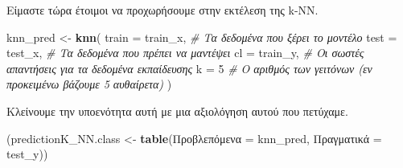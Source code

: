 \documentclass[
]{article}
\newenvironment{Shaded}{\begin{snugshade}}{\end{snugshade}}
\newcommand{\AttributeTok}[1]{\textcolor[rgb]{0.13,0.29,0.53}{#1}}
\newcommand{\CommentTok}[1]{\textcolor[rgb]{0.56,0.35,0.01}{\textit{#1}}}
\newcommand{\ConstantTok}[1]{\textcolor[rgb]{0.56,0.35,0.01}{#1}}
\newcommand{\DecValTok}[1]{\textcolor[rgb]{0.00,0.00,0.81}{#1}}
\newcommand{\FloatTok}[1]{\textcolor[rgb]{0.00,0.00,0.81}{#1}}
\newcommand{\FunctionTok}[1]{\textcolor[rgb]{0.13,0.29,0.53}{\textbf{#1}}}
\newcommand{\NormalTok}[1]{#1}
\newcommand{\OtherTok}[1]{\textcolor[rgb]{0.56,0.35,0.01}{#1}}
\newcommand{\SpecialCharTok}[1]{\textcolor[rgb]{0.81,0.36,0.00}{\textbf{#1}}}
\begin{document}
\begin{Shaded}
\end{Shaded}

Είμαστε τώρα έτοιμοι να προχωρήσουμε στην εκτέλεση της k-NN.

\begin{Shaded}
\begin{Highlighting}[]
\NormalTok{knn\_pred }\OtherTok{\textless{}{-}} \FunctionTok{knn}\NormalTok{(}
  \AttributeTok{train =}\NormalTok{ train\_x, }\CommentTok{\# Τα δεδομένα που ξέρει το μοντέλο}
  \AttributeTok{test =}\NormalTok{ test\_x, }\CommentTok{\# Τα δεδομένα που πρέπει να μαντέψει}
  \AttributeTok{cl =}\NormalTok{ train\_y, }\CommentTok{\# Οι σωστές απαντήσεις για τα δεδομένα εκπαίδευσης}
  \AttributeTok{k =} \DecValTok{5} \CommentTok{\# Ο αριθμός των γειτόνων (εν προκειμένω βάζουμε 5 αυθαίρετα)}
\NormalTok{  )}
\end{Highlighting}
\end{Shaded}

Κλείνουμε την υποενότητα αυτή με μια αξιολόγηση αυτού που πετύχαμε.

\begin{Shaded}
\begin{Highlighting}[]
\NormalTok{(predictionK\_NN.class }\OtherTok{\textless{}{-}} \FunctionTok{table}\NormalTok{(Προβλεπόμενα }\OtherTok{=}\NormalTok{ knn\_pred, Πραγματικά }\OtherTok{=}\NormalTok{ test\_y))}
\end{Highlighting}
\end{Shaded}
\end{document}
